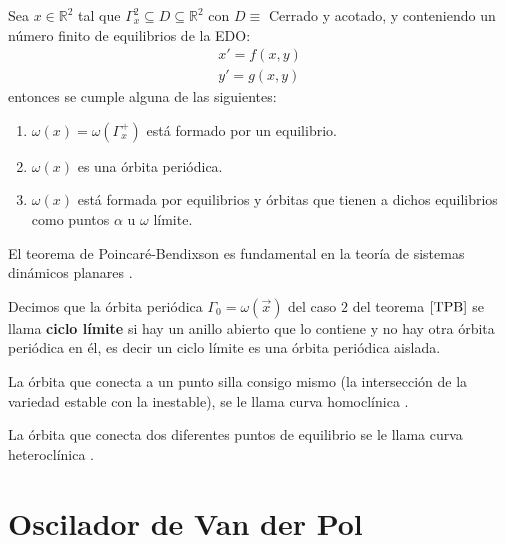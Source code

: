\begin{theorem}\label{TPB}
	Sea $x\in\mathbb{R}^2$ tal que $\varGamma_{x}^2\subseteq D\subseteq\mathbb{R}^2$ con $D\equiv$ Cerrado y acotado,
	y conteniendo un número finito de equilibrios de la EDO:
	\begin{equation}
		\begin{matrix}
			x' = f(x,y) \\
			y' = g(x,y)
		\end{matrix}
	\end{equation}
	entonces se cumple alguna de las siguientes:
	\begin{enumerate}
		\item $\omega(x)=\omega(\varGamma_{x}^+)$ está formado por un equilibrio.
		\item $\omega(x)$ es una órbita periódica.
		\item $\omega(x)$ está formada por equilibrios y órbitas que tienen a dichos equilibrios como puntos
		      $\alpha$ u $\omega$ límite.
	\end{enumerate}
\end{theorem}

El teorema de Poincaré-Bendixson es fundamental en la teoría de sistemas dinámicos planares \cite{poincare1881memoire,bendixson1901courbes}.

\begin{definition}
	Decimos que la órbita periódica $\varGamma_0=\omega(\vec{x})$
	del caso $2$ del teorema $\ref{TPB}$ se llama
	\textbf{ciclo límite} si hay un anillo abierto que lo
	contiene y no hay otra órbita periódica en él, es decir
	un ciclo límite es una órbita periódica aislada.
\end{definition}

\begin{definition}
	La órbita que conecta a un punto silla consigo mismo (la intersección de la variedad estable con la inestable), se le llama curva homoclínica \cite{kuznetsov2013elements}.
\end{definition}

\begin{definition}
	La órbita que conecta dos diferentes puntos de equilibrio se le llama curva heteroclínica \cite{kuznetsov2013elements}.
\end{definition}
\newpage

\section{Oscilador de Van der Pol}


